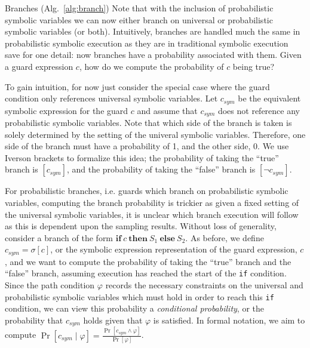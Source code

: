 \begin{paragraph}{Branches (Alg.~\ref{alg:branch})}
	Note that with the inclusion of probabilistic symbolic variables we can now either branch on universal or probabilistic symbolic variables (or both).
	Intuitively, branches are handled much the same in probabilistic symbolic execution as they are in traditional symbolic execution save for one detail: now branches have a probability associated with them.
	Given a guard expression $c$, how do we compute the probability of $c$ being true?
	
	
	To gain intuition, for now just consider the special case where the guard condition only references universal symbolic variables.
	Let $c_{sym}$ be the equivalent symbolic expression for the guard $c$ and assume that $c_{sym}$ does not reference any probabilistic symbolic variables.
	Note that which side of the branch is taken is solely determined by the setting of the univeral symbolic variables.
	Therefore, one side of the branch must have a probability of 1, and the other side, 0.
	We use Iverson brackets to formalize this idea; the probability of taking the ``true'' branch is $[c_{sym}]$, and the probability of taking the ``false'' branch is $[\neg c_{sym}]$.
	
	
	For probabilistic branches, i.e. guards which branch on probabilistic symbolic variables, computing the branch probability is trickier as given a fixed setting of the universal symbolic variables, it is unclear which branch execution will follow as this is dependent upon the sampling results.
	Without loss of generality, consider a branch of the form $\mathbf{if}~c~\mathbf{then}~S_1~\mathbf{else}~S_2$.
	As before, we define $c_{sym} = \sigma[c]$, or the symbolic expression representation of the guard expression, $c$, and we want to compute the probability of taking the ``true'' branch and the ``false'' branch, assuming execution has reached the start of the \texttt{if} condition.
	Since the path condition $\varphi$ records the necessary constraints on the universal and probabilistic symbolic variables which must hold in order to reach this \texttt{if} condition, we can view this probability a \textit{conditional probability}, or the probability that $c_{sym}$ holds given that $\varphi$ is satisfied.
	In formal notation, we aim to compute $\Pr[c_{sym} \mid \varphi] = \frac{\Pr[c_{sym}\wedge \varphi]}{\Pr[\varphi]}$.
	

\end{paragraph}
